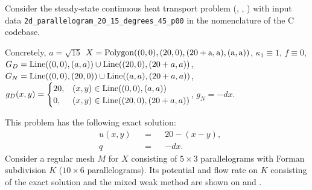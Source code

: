 \begin{example}
  \label{idec/diffusion/continuous/steady_state/examples/2d_parallelogram_20_15_degrees_45_p00-example}
  Consider the steady-state continuous heat transport problem
  (,
   ,
   )
  with input data \verb|2d_parallelogram_20_15_degrees_45_p00| in the nomenclature of the C codebase.

  Concretely,
    $a = \sqrt{15}$
    $X = {\rm Polygon((0, 0), (20, 0), (20 + a, a), (a, a))}$,
    $\kappa_1 \equiv 1$,
    $f \equiv 0$,
    $G_D = {\rm Line}((0, 0), (a, a)) \cup {\rm Line}((20, 0), (20 + a, a))$,
    $G_N = {\rm Line}((0, 0), (20, 0)) \cup {\rm Line}((a, a), (20 + a, a))$,
    $g_D(x, y) =
      \begin{cases}
        20, & (x, y) \in {\rm Line}((0, 0), (a, a)) \\
        0,  & (x, y) \in {\rm Line}((20, 0), (20 + a, a))
      \end{cases}
    $,
    $g_N = - d x$.

  This problem has the following exact solution:
  \begin{subequations}
    \begin{alignat}{3}
      & u(x, y) && = && 20 - (x - y), \\
      & q && = && - d x.
    \end{alignat}
  \end{subequations}
  Consider a regular mesh $M$ for $X$ consisting of $5 \times 3$ parallelograms
  with Forman subdivision $K$ ($10 \times 6$ parallelograms).
  Its potential and flow rate on $K$ consisting of the exact solution and the
  mixed weak method are shown on
  and
  .
\end{example}
